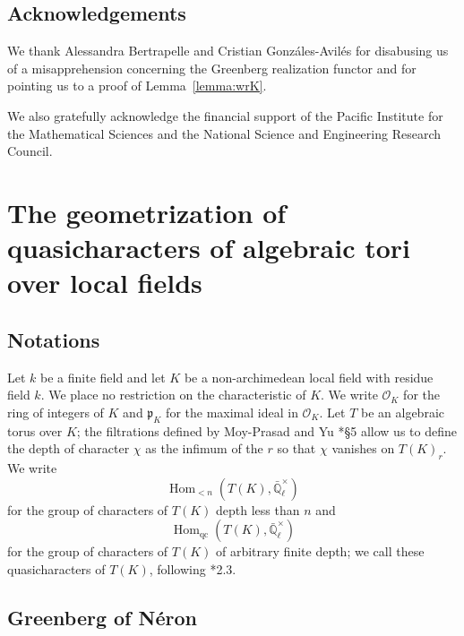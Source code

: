 \documentclass{amsart}
\theoremstyle{plain}
\theoremstyle{definition}
\theoremstyle{remark}
\newcommand{\EE}{\mathbb{\bar Q}_\ell}
\newcommand{\OK}{\mathcal{O}_K}
\newcommand{\pK}{\mathfrak{p}_K}
\newcommand{\Fq}{k}
\newcommand{\EEx}{\EE^\times}
\DeclareMathOperator{\Hom}{Hom}
\begin{document}
\subsection*{Acknowledgements}
We thank Alessandra Bertrapelle and Cristian Gonz\'ales-Avil\'es for disabusing us of a misapprehension concerning the Greenberg realization functor and for pointing us to a proof of Lemma~\ref{lemma:wrK}.

We also gratefully acknowledge the financial support of the Pacific Institute for the Mathematical Sciences
and the National Science and Engineering Research Council.


\tableofcontents

\section{The geometrization of quasicharacters of algebraic tori over local fields}

\subsection{Notations}

Let $\Fq$ be a finite field and let $K$ be a non-archimedean local field with residue field $\Fq$.
We place no restriction on the characteristic of $K$.
We write $\OK$ for the ring of integers of $K$ and $\pK$ for the maximal ideal in $\OK$.
Let $T$ be an algebraic torus over $K$; the filtrations defined by Moy-Prasad and Yu \cite{yu:03a}*{\S 5}
allow us to define the depth of character $\chi$ as the infimum of the $r$ so that $\chi$ vanishes on $T(K)_r$.
We write
\[
\Hom_{< n}(T(K),\EEx)
\]
for the group of characters of $T(K)$ depth less than $n$
and
\[
\Hom_{\text{qc}}(T(K),\EEx)
\]
for the group of characters of $T(K)$ of arbitrary finite depth;
we call these quasicharacters of $T(K)$, following \cite{tate:67a}*{2.3}.

\subsection{Greenberg of N\'eron}
\label{sec:GN}
\end{document}
